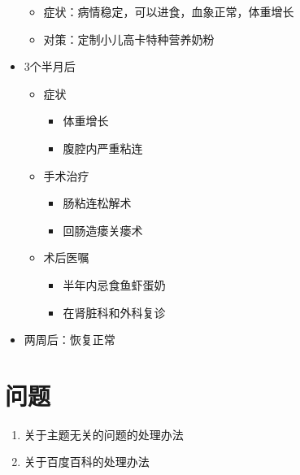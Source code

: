 \documentclass[]{article}
\providecommand{\tightlist}{%
  \setlength{\itemsep}{0pt}\setlength{\parskip}{0pt}}
\begin{document}
\begin{multicols}{3}
\begin{itemize}
  \begin{itemize}
  \tightlist
  \item
    症状：病情稳定，可以进食，血象正常，体重增长
  \item
    对策：定制小儿高卡特种营养奶粉
  \end{itemize}
\item
  3个半月后

  \begin{itemize}
  \tightlist
  \item
    症状

    \begin{itemize}
    \tightlist
    \item
      体重增长
    \item
      腹腔内严重粘连
    \end{itemize}
  \item
    手术治疗

    \begin{itemize}
    \tightlist
    \item
      肠粘连松解术
    \item
      回肠造瘘关瘘术
    \end{itemize}
  \item
    术后医嘱

    \begin{itemize}
    \tightlist
    \item
      半年内忌食鱼虾蛋奶
    \item
      在肾脏科和外科复诊
    \end{itemize}
  \end{itemize}
\item
  两周后：恢复正常
\end{itemize}
\end{multicols}

\section{问题}\label{ux95eeux9898}

\begin{enumerate}
\def\labelenumi{\arabic{enumi}.}
\tightlist
\item
  关于主题无关的问题的处理办法
\item
  关于百度百科的处理办法
\end{enumerate}

\hypertarget{refs}{}
\end{document}

